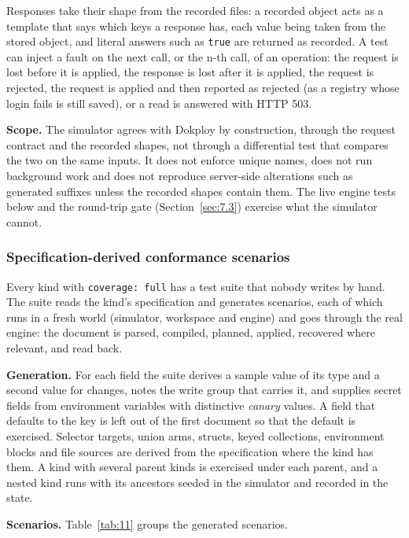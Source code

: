 Responses take their shape from the recorded files: a recorded object acts as a template that says
which keys a response has, each value being taken from the stored object, and literal answers such as
\texttt{true} are returned as recorded. A test can inject a fault on the next call, or the n-th call, of an
operation: the request is lost before it is applied, the response is lost after it is applied, the
request is rejected, the request is applied and then reported as rejected (as a registry whose login
fails is still saved), or a read is answered with HTTP 503.

\textbf{Scope.} The simulator agrees with Dokploy by construction, through the request contract and the
recorded shapes, not through a differential test that compares the two on the same inputs. It does not
enforce unique names, does not run background work and does not reproduce server-side alterations
such as generated suffixes unless the recorded shapes contain them. The live engine tests below and the round-trip gate (Section~\ref{sec:7.3})
exercise what the simulator cannot.

\subsubsection*{Specification-derived conformance scenarios}

Every kind with \texttt{coverage:\ full} has a test suite that nobody writes by hand. The suite reads the
kind's specification and generates scenarios, each of which runs in a fresh world (simulator,
workspace and engine) and goes through the real engine: the document is parsed, compiled, planned,
applied, recovered where relevant, and read back.

\textbf{Generation.} For each field the suite derives a sample value of its type and a second value for
changes, notes the write group that carries it, and supplies secret fields from environment variables
with distinctive \emph{canary} values. A field that defaults to the key is left out of the first document
so that the default is exercised. Selector targets, union arms, structs, keyed collections,
environment blocks and file sources are derived from the specification where the kind has them. A
kind with several parent kinds is exercised under each parent, and a nested kind runs with its
ancestors seeded in the simulator and recorded in the state.

\textbf{Scenarios.} Table~\ref{tab:11} groups the generated scenarios.

